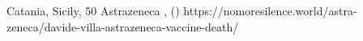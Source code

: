           {Catania, Sicily, }
          {50}
          {Astrazeneca}
          {}
          {
            ,
             ()
          }
          {https://nomoresilence.world/astra-zeneca/davide-villa-astrazeneca-vaccine-death/}



